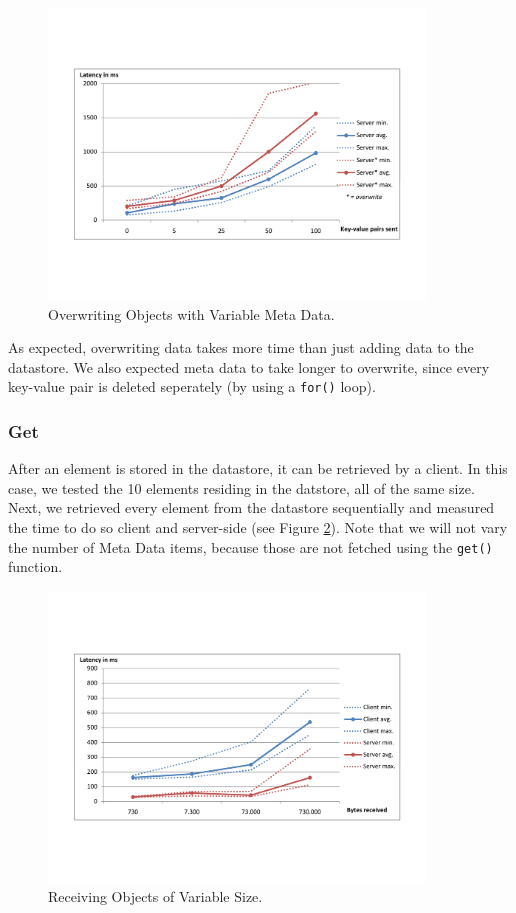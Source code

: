 \begin{figure} %
\begin{center}
\includegraphics[trim=5cm 4cm 5cm 5cm,width=10cm]{./figures/ovw_md.pdf}
\caption{Overwriting Objects with Variable Meta Data. \label{ovw-md-size}}
\end{center}
\end{figure}

As expected, overwriting data takes more time than just adding data to the
datastore. We also expected meta data to take longer to overwrite, since every
key-value pair is deleted seperately (by using a \texttt{for()} loop). 

\subsubsection{Get}
After an element is stored in the datastore, it can be retrieved by a client.
In this case, we tested the 10 elements residing in the datstore, all of the
same size. Next, we retrieved every element from the datastore sequentially and
measured the time to do so client and server-side (see Figure
\ref{get-obj-size}). Note that we will not vary the number of Meta Data items,
because those are not fetched using the \texttt{get()} function.

\begin{figure} %
\begin{center}
\includegraphics[trim=5cm 4cm 5cm 5cm,width=10cm]{./figures/get_obj.pdf}
\caption{Receiving Objects of Variable Size. \label{get-obj-size}}
\end{center}
\end{figure}

